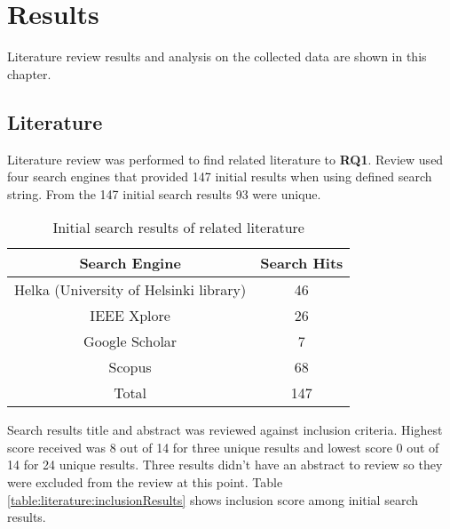 \chapter{Results\label{results}}
Literature review results and analysis on the collected data are shown in this chapter.

\section{Literature}
Literature review was performed to find related literature to \textbf{RQ1}.
Review used four search engines that provided 147 initial results when using defined search string.
From the 147 initial search results 93 were unique.
\begin{table}[ht!]
    \begin{tabular}{|c c|} 
        \hline
        Search Engine
        & Search Hits
        \\ 
        \hline\hline
        Helka (University of Helsinki library)
        & 46
        \\ 
        \hline
        IEEE Xplore
        & 26
        \\ 
        \hline
        Google Scholar
        & 7
        \\ 
        \hline
        Scopus
        & 68
        \\ 
        \hline
        Total
        & 147
        \\ 
        \hline
    \end{tabular}    
    \caption{Initial search results of related literature}
    \label{table:literature:initialSearchResults}
\end{table}
Search results title and abstract was reviewed against inclusion criteria.
Highest score received was 8 out of 14 for three unique results and lowest score 0 out of 14 for 24 unique results.
Three results didn't have an abstract to review so they were excluded from the review at this point.
Table \ref{table:literature:inclusionResults} shows inclusion score among initial search results.
